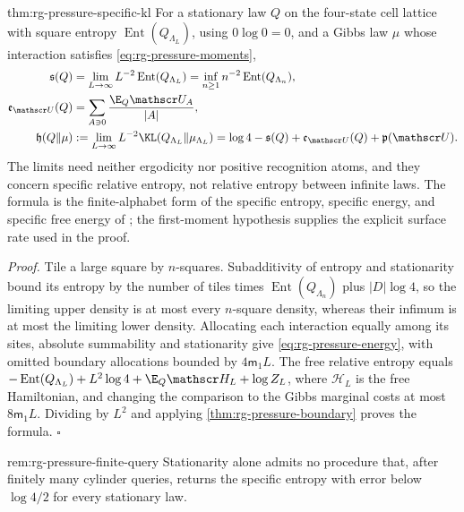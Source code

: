 {thm:rg-pressure-specific-kl}
For a stationary law $Q$ on the four-state cell lattice with square entropy
$\operatorname{Ent}(Q_{\Lambda_L})$, using $0\log0=0$, and a Gibbs law $\mu$
whose interaction satisfies \cref{eq:rg-pressure-moments},
\begin{align}
 \mathfrak s(Q)&=\lim_{L\to\infty}L^{-2}\operatorname{Ent}(Q_{\Lambda_L})
       =\inf_{n\geq1}n^{-2}\operatorname{Ent}(Q_{\Lambda_n}),
 \label{eq:rg-pressure-entropy}\\
 \mathfrak e_{\mathscr U}(Q)&=\sum_{A\ni0}\frac{\E_Q\mathscr U_A}{|A|},
 \label{eq:rg-pressure-energy}\\
 \mathfrak h(Q\Vert\mu)&:=\lim_{L\to\infty}L^{-2}
       \KL(Q_{\Lambda_L}\Vert\mu_{\Lambda_L})
       =\log4-\mathfrak s(Q)+\mathfrak e_{\mathscr U}(Q)+\mathfrak p(\mathscr U).
 \label{eq:rg-pressure-specific-kl}
\end{align}
The limits need neither ergodicity nor positive recognition atoms, and they
concern specific relative entropy, not relative entropy between infinite
laws. The formula is the finite-alphabet form of the specific entropy,
specific energy, and specific free energy of
\citet[Secs.~15.2 and~15.3, Thm.~15.30]{Georgii1988}; the first-moment
hypothesis supplies the explicit surface rate used in the proof.

\noindent\emph{Proof.}
Tile a large square by $n$-squares. Subadditivity of entropy and
stationarity bound its entropy by the number of tiles times
$\operatorname{Ent}(Q_{\Lambda_n})$ plus $|D|\log4$, so the limiting upper density is at most
every $n$-square density, whereas their infimum is at most the limiting
lower density. Allocating each interaction equally among its sites,
absolute summability and stationarity give \cref{eq:rg-pressure-energy},
with omitted boundary allocations bounded by $4\mathsf m_1L$. The free
relative entropy equals
$-\operatorname{Ent}(Q_{\Lambda_L})+L^2\log4+\E_Q\mathscr H_L+\log Z_L$, where
$\mathscr H_L$ is the free Hamiltonian, and changing
the comparison to the Gibbs marginal costs at most $8\mathsf m_1L$. Dividing
by $L^2$ and applying \cref{thm:rg-pressure-boundary} proves the formula.
$\square$

{rem:rg-pressure-finite-query}
Stationarity alone admits no procedure that, after finitely many cylinder
queries, returns the specific entropy with error below $\log4/2$ for every
stationary law. 

